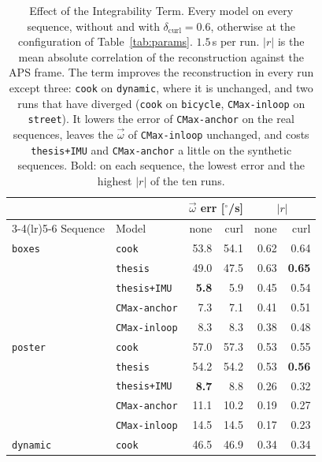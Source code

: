 \documentclass[journal]{IEEEtran}
\newcommand{\wvec}{\vec{\omega}}
\begin{document}
\begin{table}[!t]
\renewcommand{\arraystretch}{1.1}
\caption{Effect of the Integrability Term. \textnormal{Every model on every
sequence, without and with $\delta_{\text{curl}} = 0.6$, otherwise at the
configuration of Table~\ref{tab:params}. $1.5$\,s per run. $|r|$ is the
mean absolute correlation of the reconstruction against the APS frame. The term
improves the reconstruction in every run except three: \texttt{cook} on
\texttt{dynamic}, where it is unchanged, and two runs that have diverged
(\texttt{cook} on \texttt{bicycle}, \texttt{CMax-inloop} on \texttt{street}).
It lowers the error of \texttt{CMax-anchor} on the real sequences, leaves the
$\wvec$ of \texttt{CMax-inloop} unchanged, and costs \texttt{thesis+IMU} and
\texttt{CMax-anchor} a little on the synthetic sequences. Bold: on each sequence, the lowest
error and the highest $|r|$ of the ten runs.}}
\label{tab:curl}
\centering
\footnotesize
\begin{tabular}{@{}llrrrr@{}}
\toprule
 & & \multicolumn{2}{c}{$\wvec$ err [$^\circ$/s]} & \multicolumn{2}{c}{$|r|$} \\
\cmidrule(lr){3-4}\cmidrule(lr){5-6}
Sequence & Model & none & curl & none & curl \\
\midrule
\texttt{boxes}        & \texttt{cook}         & 53.8 & 54.1 & 0.62 & 0.64 \\
                      & \texttt{thesis}       & 49.0 & 47.5 & 0.63 & \textbf{0.65} \\
                      & \texttt{thesis+IMU}   & \textbf{5.8} & 5.9 & 0.45 & 0.54 \\
                      & \texttt{CMax-anchor}  & 7.3 & 7.1 & 0.41 & 0.51 \\
                      & \texttt{CMax-inloop}  & 8.3 & 8.3 & 0.38 & 0.48 \\
\midrule
\texttt{poster}       & \texttt{cook}         & 57.0 & 57.3 & 0.53 & 0.55 \\
                      & \texttt{thesis}       & 54.2 & 54.2 & 0.53 & \textbf{0.56} \\
                      & \texttt{thesis+IMU}   & \textbf{8.7} & 8.8 & 0.26 & 0.32 \\
                      & \texttt{CMax-anchor}  & 11.1 & 10.2 & 0.19 & 0.27 \\
                      & \texttt{CMax-inloop}  & 14.5 & 14.5 & 0.17 & 0.23 \\
\midrule
\texttt{dynamic}      & \texttt{cook}         & 46.5 & 46.9 & 0.34 & 0.34 \\

\end{tabular}
\end{table}
\end{document}
